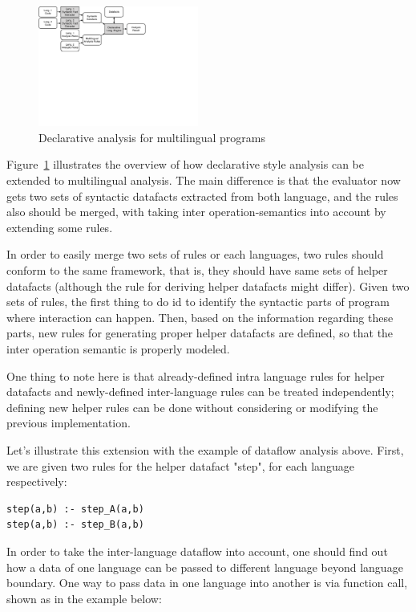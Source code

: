 \begin{figure}[t]
  \centering
  \vspace{2mm}
  \includegraphics[width=0.47\textwidth]{img/overview2}
  \caption{Declarative analysis for multilingual programs}
  \label{fig:overview2}
\end{figure}

Figure~\ref{fig:overview2} illustrates the overview of how declarative style analysis can be
extended to multilingual analysis. The main difference is that the evaluator
now gets two sets of syntactic datafacts extracted from both language, and the
rules also should be merged, with taking inter operation-semantics into account by
extending some rules.

In order to easily merge two sets of rules or each languages, two rules should
conform to the same framework, that is, they should have same sets of helper
datafacts (although the rule for deriving helper datafacts might differ).
Given two sets of rules, the first thing to do id to identify the syntactic
parts of program where interaction can happen.  Then, based on the information
regarding these parts, new rules for generating proper helper datafacts are
defined, so that the inter operation semantic is properly modeled.

One thing to note here is that already-defined intra language rules for helper
datafacts and newly-defined inter-language rules can be treated independently;
defining new helper rules can be done without considering or modifying the 
previous implementation.

Let's illustrate this extension with the example of dataflow analysis above.
First, we are given two rules for the helper datafact "step", for each language
respectively:
\begin{lstlisting}[style=myDatalog,xleftmargin=2.5em]
step(a,b) :- step_A(a,b)
step(a,b) :- step_B(a,b)
\end{lstlisting}
In order to take the inter-language dataflow into account, one should find out
how a data of one language can be passed to different language beyond language
boundary.  One way to pass data in one language into another is via function
call, shown as in the example below:

